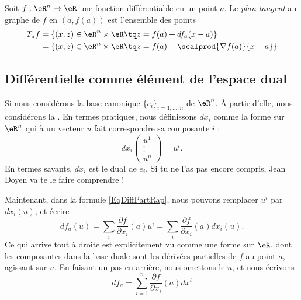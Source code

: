 \begin{definition}
  Soit $f : \eR^n \to\eR$ une fonction différentiable en un point
  $a$. Le \emph{plan tangent} au graphe de $f$ en $(a,f(a))$ est
  l'ensemble des points
  \begin{equation*}
    \begin{split}
      T_af &= \{ (x,z) \in \eR^n \times \eR \tq z = f(a) + d f_a (x-a)\}\\
      &= \{ (x,z) \in \eR^n \times \eR \tq z = f(a) + \scalprod{\nabla f(a)}{x-a}\}
    \end{split}
  \end{equation*}
\end{definition}

                    \subsection{Différentielle comme élément de l'espace dual}


Si nous considérons la base canonique $\{ e_i \}_{i=1,\ldots,n}$ de $\eR^n$. À partir d'elle, nous considérons la . En termes pratiques, nous définissons $dx_i$ comme la forme sur $\eR^n$ qui à un vecteur $u$ fait correspondre sa composante $i$ :
\begin{equation}
    dx_i\begin{pmatrix}
    u^1 \\ 
    \vdots  \\ 
    u^n 
\end{pmatrix}=u^i.
\end{equation}
En termes savants, $dx_i$ est le dual de $e_i$. Si tu ne l'as pas encore compris, Jean Doyen va te le faire comprendre !


Maintenant, dans la formule \eqref{EqDiffPartRap}, nous pouvons remplacer $u^i$ par $dx_i(u)$, et écrire
\begin{equation}
    df_a(u)=\sum_i\frac{ \partial f }{ \partial x_i }(a)u^i=\sum_i\frac{ \partial f }{ \partial x_i }(a)dx_i(u).
\end{equation}
Ce qui arrive tout à droite est explicitement vu comme une forme sur $\eR$, dont les composantes dans la base duale sont les dérivées partielles de $f$ au point $a$, agissant sur $u$. En faisant un pas en arrière, nous omettons le $u$, et nous écrivons
\begin{equation}
    df_a=\sum_{i=1}^n\frac{ \partial f }{ \partial x_i }(a)dx^i
\end{equation}


